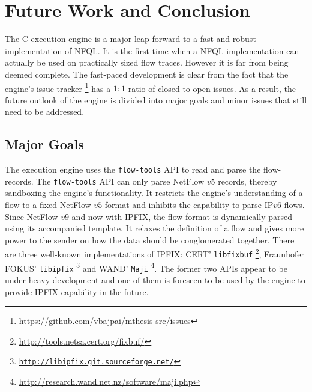\chapter{Future Work and Conclusion}\label{ch:future-work}

The C execution engine is a major leap forward to a fast and robust
implementation of \ac{NFQL}. It is the first time when a \ac{NFQL}
implementation can actually be used on practically sized flow traces. However
it is far from being deemed complete. The fast-paced development is clear from
the fact that the engine's issue tracker
\footnote{\url{https://github.com/vbajpai/mthesis-src/issues}} has a $1:1$
ratio of closed to open issues. As a result, the future outlook of the engine
is divided into major goals and minor issues that still need to be addressed.

\section{Major Goals}\label{sec:major-goals}

The execution engine uses the \texttt{flow-tools} \ac{API} to read and parse
the flow-records. The \texttt{flow-tools} \ac{API} can only parse NetFlow $v5$
records, thereby sandboxing the engine's functionality. It restricts the
engine's understanding of a flow to a fixed NetFlow $v5$ format and inhibits
the capability to parse \ac{IP}$v6$ flows. Since NetFlow $v9$ and now with
\ac{IPFIX}, the flow format  is dynamically parsed
using its accompanied template. It relaxes the definition of a flow and gives
more power to the sender on how the data should be conglomerated together.
There are three well-known implementations of \ac{IPFIX}: CERT'
\texttt{libfixbuf} \footnote{\url{http://tools.netsa.cert.org/fixbuf/}},
Fraunhofer FOKUS' \texttt{libipfix}
\footnote{\href{http://libipfix.git.sourceforge.net/git/gitweb.cgi?p=libipfix/libipfix;a=summary}{\texttt{http://libipfix.git.sourceforge.net/}}}
and WAND' \texttt{Maji}
\footnote{\url{http://research.wand.net.nz/software/maji.php}}. The former two
\ac{API}s appear to be under heavy development and one of them is foreseen to
be used by the engine to provide \ac{IPFIX} capability in the future.




